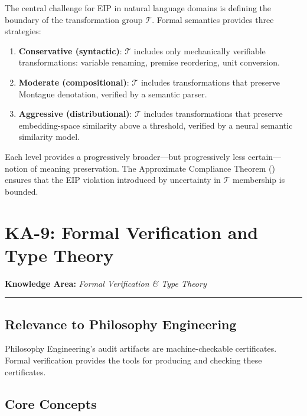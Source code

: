 \documentclass[12pt,letterpaper]{article}
\theoremstyle{definition}
\theoremstyle{plain}
\newcommand{\calT}{\mathcal{T}}
\newcommand{\ka}[1]{\vspace{1em}\noindent\textbf{\large Knowledge Area:} \textit{#1}\vspace{0.5em}\hrule\vspace{0.5em}}
\begin{document}
The central challenge for EIP in natural language domains is defining the boundary of the transformation group $\calT$. Formal semantics provides three strategies:

\begin{enumerate}
    \item \textbf{Conservative (syntactic)}: $\calT$ includes only mechanically verifiable transformations: variable renaming, premise reordering, unit conversion.
    \item \textbf{Moderate (compositional)}: $\calT$ includes transformations that preserve Montague denotation, verified by a semantic parser.
    \item \textbf{Aggressive (distributional)}: $\calT$ includes transformations that preserve embedding-space similarity above a threshold, verified by a neural semantic similarity model.
\end{enumerate}

Each level provides a progressively broader---but progressively less certain---notion of meaning preservation. The Approximate Compliance Theorem () ensures that the EIP violation introduced by uncertainty in $\calT$ membership is bounded.


\section{KA-9: Formal Verification and Type Theory}
\label{sec:ka9}

\ka{Formal Verification \& Type Theory}

\subsection{Relevance to Philosophy Engineering}

Philosophy Engineering's audit artifacts are machine-checkable certificates. Formal verification provides the tools for producing and checking these certificates.

\subsection{Core Concepts}
\end{document}
